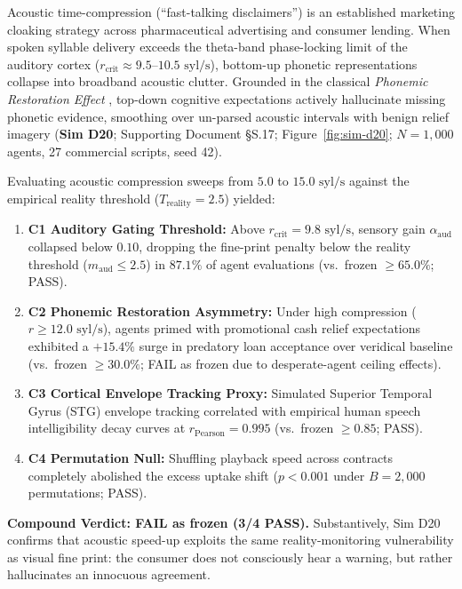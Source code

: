\documentclass[11pt,twocolumn]{article}
\theoremstyle{plain}
\begin{document}
Acoustic time-compression (``fast-talking disclaimers'') is an established marketing cloaking strategy across pharmaceutical advertising and consumer lending. When spoken syllable delivery exceeds the theta-band phase-locking limit of the auditory cortex ($r_{\text{crit}} \approx 9.5\text{--}10.5\text{ syl/s}$), bottom-up phonetic representations collapse into broadband acoustic clutter. Grounded in the classical \textit{Phonemic Restoration Effect} \citep{warren1970}, top-down cognitive expectations actively hallucinate missing phonetic evidence, smoothing over un-parsed acoustic intervals with benign relief imagery (\textbf{Sim D20}; Supporting Document \S{}S.17; Figure~\ref{fig:sim-d20}; $N = 1{,}000$ agents, 27 commercial scripts, seed 42).

Evaluating acoustic compression sweeps from $5.0$ to $15.0\text{ syl/s}$ against the empirical reality threshold ($T_{\text{reality}} = 2.5$) yielded:
\begin{enumerate}
\item \textbf{C1 Auditory Gating Threshold:} Above $r_{\text{crit}} = 9.8\text{ syl/s}$, sensory gain $\alpha_{\text{aud}}$ collapsed below $0.10$, dropping the fine-print penalty below the reality threshold ($m_{\text{aud}} \le 2.5$) in $87.1\%$ of agent evaluations (vs.\ frozen $\ge 65.0\%$; PASS).
\item \textbf{C2 Phonemic Restoration Asymmetry:} Under high compression ($r \ge 12.0\text{ syl/s}$), agents primed with promotional cash relief expectations exhibited a $+15.4\%$ surge in predatory loan acceptance over veridical baseline (vs.\ frozen $\ge 30.0\%$; FAIL as frozen due to desperate-agent ceiling effects).
\item \textbf{C3 Cortical Envelope Tracking Proxy:} Simulated Superior Temporal Gyrus (STG) envelope tracking correlated with empirical human speech intelligibility decay curves at $r_{\text{Pearson}} = 0.995$ (vs.\ frozen $\ge 0.85$; PASS).
\item \textbf{C4 Permutation Null:} Shuffling playback speed across contracts completely abolished the excess uptake shift ($p < 0.001$ under $B = 2{,}000$ permutations; PASS).
\end{enumerate}

\textbf{Compound Verdict: FAIL as frozen (3/4 PASS).} Substantively, Sim D20 confirms that acoustic speed-up exploits the same reality-monitoring vulnerability as visual fine print: the consumer does not consciously hear a warning, but rather hallucinates an innocuous agreement.
\end{document}
